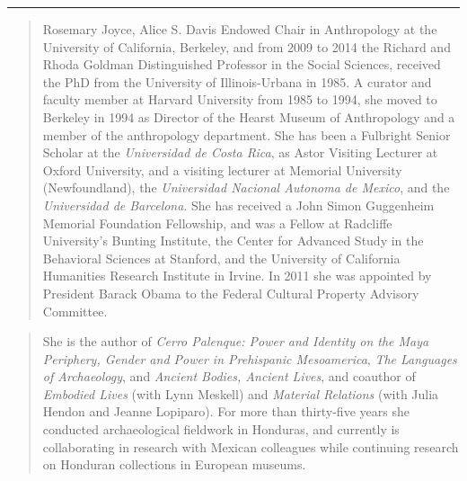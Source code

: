 \noindent\rule[0.5ex]{\linewidth}{1pt}

\blockquote{Rosemary Joyce, Alice S. Davis Endowed Chair in Anthropology at the University of California, Berkeley, and from 2009 to 2014 the Richard and Rhoda Goldman Distinguished Professor in the Social Sciences, received the PhD from the University of Illinois-Urbana in 1985. A curator and faculty member at Harvard University from 1985 to 1994, she moved to Berkeley in 1994 as Director of the Hearst Museum of Anthropology and a member of the anthropology department. She has been a Fulbright Senior Scholar at the \textit{Universidad de Costa Rica}, as Astor Visiting Lecturer at Oxford University, and a visiting lecturer at Memorial University (Newfoundland), the \textit{Universidad Nacional Autonoma de Mexico}, and the \textit{Universidad de Barcelona}. She has received a John Simon Guggenheim Memorial Foundation Fellowship, and was a Fellow at Radcliffe University's Bunting Institute, the Center for Advanced Study in the Behavioral Sciences at Stanford, and the University of California Humanities Research Institute in Irvine. In 2011 she was appointed by President Barack Obama to the Federal Cultural Property Advisory Committee.}

\blockquote{She is the author of \textit{Cerro Palenque: Power and Identity on the Maya Periphery, Gender and Power in Prehispanic Mesoamerica}, \textit{The Languages of Archaeology}, and \textit{Ancient Bodies, Ancient Lives}, and coauthor of \textit{Embodied Lives} (with Lynn Meskell) and \textit{Material Relations} (with Julia Hendon and Jeanne Lopiparo). For more than thirty-five years she conducted archaeological fieldwork in Honduras, and currently is collaborating in research with Mexican colleagues while continuing research on Honduran collections in European museums.}

	\label{Johnson:lastpage}
\closingarticle